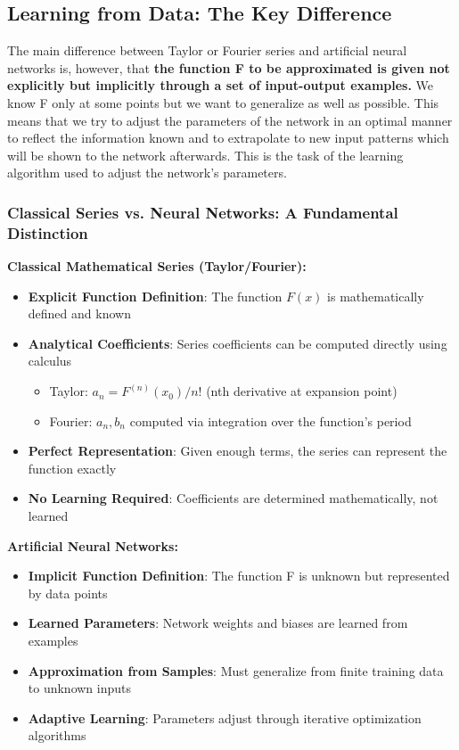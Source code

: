 \subsection{Learning from Data: The Key Difference}
The main difference between Taylor or Fourier series and artificial neural networks is, however, that \textbf{the function F to be approximated is given not explicitly but implicitly through a set of input-output examples.} We know F only at some points but we want to generalize as well as possible. This means that we try to adjust the parameters of the network in an optimal manner to reflect the information known and to extrapolate to new input patterns which will be shown to the network afterwards. This is the task of the learning algorithm used to adjust the network's parameters.

\subsubsection{Classical Series vs. Neural Networks: A Fundamental Distinction}

\textbf{Classical Mathematical Series (Taylor/Fourier):}
\begin{itemize}
    \item \textbf{Explicit Function Definition}: The function $F(x)$ is mathematically defined and known
    \item \textbf{Analytical Coefficients}: Series coefficients can be computed directly using calculus
    \begin{itemize}
        \item Taylor: $a_n = F^{(n)}(x_0)/n!$ (nth derivative at expansion point)
        \item Fourier: $a_n, b_n$ computed via integration over the function's period
    \end{itemize}
    \item \textbf{Perfect Representation}: Given enough terms, the series can represent the function exactly
    \item \textbf{No Learning Required}: Coefficients are determined mathematically, not learned
\end{itemize}

\textbf{Artificial Neural Networks:}
\begin{itemize}
    \item \textbf{Implicit Function Definition}: The function F is unknown but represented by data points
    \item \textbf{Learned Parameters}: Network weights and biases are learned from examples
    \item \textbf{Approximation from Samples}: Must generalize from finite training data to unknown inputs
    \item \textbf{Adaptive Learning}: Parameters adjust through iterative optimization algorithms
\end{itemize}

